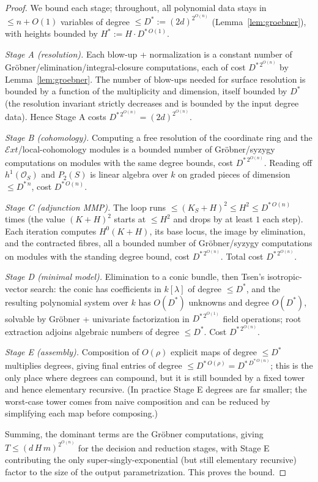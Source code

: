 \documentclass{amsart}
\theoremstyle{plain}
\theoremstyle{definition}
\newcommand{\cO}{\mathcal{O}}
\begin{document}
\begin{proof}
We bound each stage; throughout, all polynomial data stays in $\le n+O(1)$
variables of degree $\le D^*:=(2d)^{2^{O(n)}}$ (Lemma~\ref{lem:groebner}), with
heights bounded by $H^*:=H\cdot D^{*\,O(1)}$.

\emph{Stage A (resolution).}  Each blow-up + normalization is a constant number
of Gr\"obner/elimination/integral-closure computations, each of cost
$D^{*\,2^{O(n)}}$ by Lemma~\ref{lem:groebner}.  The number of blow-ups needed for
surface resolution is bounded by a function of the multiplicity and dimension,
itself bounded by $D^*$ (the resolution invariant strictly decreases and is
bounded by the input degree data).  Hence Stage A costs $D^{*\,2^{O(n)}}=
(2d)^{2^{O(n)}}$.

\emph{Stage B (cohomology).}  Computing a free resolution of the coordinate ring
and the $\mathcal{E}xt$/local-cohomology modules is a bounded number of
Gr\"obner/syzygy computations on modules with the same degree bounds, cost
$D^{*\,2^{O(n)}}$.  Reading off $h^1(\cO_S)$ and $P_2(S)$ is linear algebra over
$k$ on graded pieces of dimension $\le D^{*\,n}$, cost $D^{*\,O(n)}$.

\emph{Stage C (adjunction MMP).}  The loop runs $\le(K_S+H)^2\le H^2\le
D^{*\,O(n)}$ times (the value $(K+H)^2$ starts at $\le H^2$ and drops by at least
$1$ each step).  Each iteration computes $H^0(K+H)$, its base locus, the image by
elimination, and the contracted fibres, all a bounded number of Gr\"obner/syzygy
computations on modules with the standing degree bound, cost $D^{*\,2^{O(n)}}$.
Total cost $D^{*\,2^{O(n)}}$.

\emph{Stage D (minimal model).}  Elimination to a conic bundle, then Tsen's
isotropic-vector search: the conic has coefficients in $k[\lambda]$ of degree
$\le D^*$, and the resulting polynomial system over $k$ has $O(D^*)$ unknowns and
degree $O(D^*)$, solvable by Gr\"obner + univariate factorization in
$D^{*\,2^{O(1)}}$ field operations; root extraction adjoins algebraic numbers of
degree $\le D^*$.  Cost $D^{*\,2^{O(n)}}$.

\emph{Stage E (assembly).}  Composition of $O(\rho)$ explicit maps of degree
$\le D^*$ multiplies degrees, giving final entries of degree $\le D^{*\,O(\rho)}=
D^{*\,D^{*\,O(n)}}$; this is the only place where degrees can compound, but it is
still bounded by a fixed tower and hence elementary recursive.  (In practice
Stage E degrees are far smaller; the worst-case tower comes from naive
composition and can be reduced by simplifying each map before composing.)

Summing, the dominant terms are the Gr\"obner computations, giving
$T\le(d\,H\,m)^{2^{O(n)}}$ for the decision and reduction stages, with Stage E
contributing the only super-singly-exponential (but still elementary recursive)
factor to the size of the output parametrization.  This proves the bound.
\end{proof}
\end{document}
